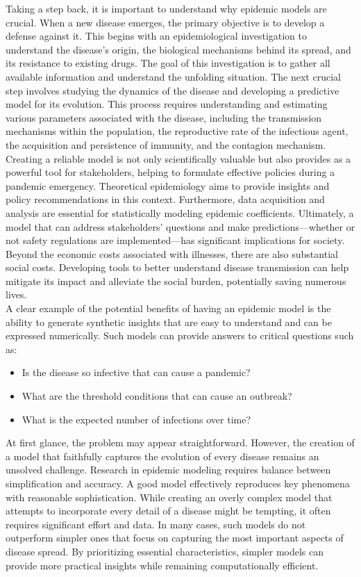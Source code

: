 \noindent Taking a step back, it is important to understand why epidemic models are crucial.
When a new disease emerges, the primary objective is to develop a defense against it. This begins with an epidemiological investigation to understand the disease's origin, the biological mechanisms behind its spread, and its resistance to existing drugs. The goal of this investigation is to gather all available information and understand the unfolding situation.
The next crucial step involves studying the dynamics of the disease and developing a predictive model for its evolution. This process requires understanding and estimating various parameters associated with the disease, including the transmission mechanisms within the population, the reproductive rate of the infectious agent, the acquisition and persistence of immunity, and the contagion mechanism.
Creating a reliable model is not only scientifically valuable but also provides as a powerful tool for stakeholders, helping to formulate effective policies during a pandemic emergency. Theoretical epidemiology aims to provide insights and policy recommendations in this context. Furthermore, data acquisition and analysis are essential for statistically modeling epidemic coefficients. 
Ultimately, a model that can address stakeholders' questions and make predictions—whether or not safety regulations are implemented—has significant implications for society. Beyond the economic costs associated with illnesses, there are also substantial social costs. Developing tools to better understand disease transmission can help mitigate its impact and alleviate the social burden, potentially saving numerous lives.
\\ \newline
A clear example of the potential benefits of having an epidemic model is the ability to generate synthetic insights that are easy to understand and can be expressed numerically. Such models can provide answers to critical questions such as:
\begin{itemize}
	\item Is the disease so infective that can cause a pandemic?
	\item What are the threshold conditions that can cause an outbreak? 
	\item What is the expected number of infections over time?
\end{itemize}

At first glance, the problem may appear straightforward. However, the creation of a model that faithfully captures the evolution of every disease remains an unsolved challenge.
Research in epidemic modeling requires balance between simplification and accuracy. A good model effectively reproduces key phenomena with reasonable sophistication. While creating an overly complex model that attempts to incorporate every detail of a disease might be tempting, it often requires significant effort and data. In many cases, such models do not outperform simpler ones that focus on capturing the most important aspects of disease spread. By prioritizing essential characteristics, simpler models can provide more practical insights while remaining computationally efficient.

